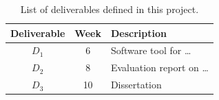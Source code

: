 \documentclass[a4paper,11pt]{article}
\begin{document}
\begin{table}[htbp]
    \begin{center}
        \begin{tabular}{|c|c|l|}
        \hline
        \textbf{Deliverable} & \textbf{Week} & \textbf{Description} \\
        \hline
        $D_1$ & 6 & Software tool for \dots\\
        $D_2$ & 8 & Evaluation report on \dots\\
        $D_3$ & 10 & Dissertation \\
        \hline
        \end{tabular}
    \end{center}
    \caption{List of deliverables defined in this project.}
    \label{fig:deliverables}
\end{table}

\pagebreak

{\small
}
\end{document}
